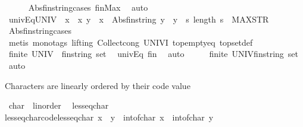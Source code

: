 \begin{isabellebody}
\ \ \ \ \isamarkupfalse%
\ Abs{\isacharunderscore}fin{\isacharunderscore}string{\isacharunderscore}cases\ finMax\ \isamarkupfalse%
\ auto\isanewline
\ \ \isamarkupfalse%
\ univEq{\isacharcolon}{\isachardoublequoteopen}UNIV\ {\isacharequal}\ {\isacharbraceleft}x\ {\isacharbar}\ x\ y\ {\isachardot}\ x\ {\isacharequal}\ Abs{\isacharunderscore}fin{\isacharunderscore}string\ y\ {\isasymand}\ y\ {\isasymin}\ {\isacharbraceleft}s{\isachardot}\ length\ s\ {\isasymle}\ MAX{\isacharunderscore}STR{\isacharbraceright}{\isacharbraceright}{\isachardoublequoteclose}\isanewline
\ \ \ \ \isamarkupfalse%
\ Abs{\isacharunderscore}fin{\isacharunderscore}string{\isacharunderscore}cases\ \ \isanewline
\ \ \ \ \isamarkupfalse%
\ {\isacharparenleft}metis\ {\isacharparenleft}mono{\isacharunderscore}tags{\isacharcomma}\ lifting{\isacharparenright}\ Collect{\isacharunderscore}cong\ UNIV{\isacharunderscore}I\ top{\isacharunderscore}empty{\isacharunderscore}eq\ top{\isacharunderscore}set{\isacharunderscore}def{\isacharparenright}\isanewline
\ \ \isamarkupfalse%
\ \isamarkupfalse%
\ {\isachardoublequoteopen}finite\ {\isacharparenleft}UNIV\ {\isacharcolon}{\isacharcolon}\ fin{\isacharunderscore}string\ set{\isacharparenright}{\isachardoublequoteclose}\ \isamarkupfalse%
\ univEq\ fin\ \isamarkupfalse%
\ auto\isanewline
\ \ \isamarkupfalse%
\ \isamarkupfalse%
\ {\isachardoublequoteopen}finite\ {\isacharparenleft}UNIV{\isacharcolon}{\isacharcolon}fin{\isacharunderscore}string\ set{\isacharparenright}{\isachardoublequoteclose}\ \isamarkupfalse%
\ auto\isanewline
{}\isamarkupfalse%
%
\endisatagproof
{\isafoldproof}%
%
\isadelimproof
%
\endisadelimproof
\isanewline
{}\isamarkupfalse%
%
\begin{isamarkuptext}%
Characters are linearly ordered by their code value%
\end{isamarkuptext}\isamarkuptrue%
\isamarkupfalse%
\ char\ {\isacharcolon}{\isacharcolon}\ linorder\ \isanewline
{}\isamarkupfalse%
\ less{\isacharunderscore}eq{\isacharunderscore}char\ \isanewline
less{\isacharunderscore}eq{\isacharunderscore}char{\isacharbrackleft}code{\isacharbrackright}{\isacharcolon}{\isachardoublequoteopen}less{\isacharunderscore}eq{\isacharunderscore}char\ x\ \ y\ {\isasymequiv}\ int{\isacharunderscore}of{\isacharunderscore}char\ x\ {\isasymle}\ int{\isacharunderscore}of{\isacharunderscore}char\ y{\isachardoublequoteclose}\isanewline

\end{isabellebody}
